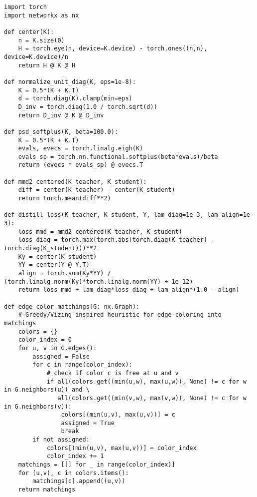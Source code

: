 \documentclass{article}
\begin{document}
\begin{lstlisting}[style=py, caption={Postprocessing, matching-based batching (edge-coloring heuristic), and distillation losses.}]
import torch
import networkx as nx

def center(K):
    n = K.size(0)
    H = torch.eye(n, device=K.device) - torch.ones((n,n), device=K.device)/n
    return H @ K @ H

def normalize_unit_diag(K, eps=1e-8):
    K = 0.5*(K + K.T)
    d = torch.diag(K).clamp(min=eps)
    D_inv = torch.diag(1.0 / torch.sqrt(d))
    return D_inv @ K @ D_inv

def psd_softplus(K, beta=100.0):
    K = 0.5*(K + K.T)
    evals, evecs = torch.linalg.eigh(K)
    evals_sp = torch.nn.functional.softplus(beta*evals)/beta
    return (evecs * evals_sp) @ evecs.T

def mmd2_centered(K_teacher, K_student):
    diff = center(K_teacher) - center(K_student)
    return torch.mean(diff**2)

def distill_loss(K_teacher, K_student, Y, lam_diag=1e-3, lam_align=1e-3):
    loss_mmd = mmd2_centered(K_teacher, K_student)
    loss_diag = torch.max(torch.abs(torch.diag(K_teacher) - torch.diag(K_student)))**2
    Ky = center(K_student)
    YY = center(Y @ Y.T)
    align = torch.sum(Ky*YY) / (torch.linalg.norm(Ky)*torch.linalg.norm(YY) + 1e-12)
    return loss_mmd + lam_diag*loss_diag + lam_align*(1.0 - align)

def edge_color_matchings(G: nx.Graph):
    # Greedy/Vizing-inspired heuristic for edge-coloring into matchings
    colors = {}
    color_index = 0
    for u, v in G.edges():
        assigned = False
        for c in range(color_index):
            # check if color c is free at u and v
            if all(colors.get((min(u,w), max(u,w)), None) != c for w in G.neighbors(u)) and \
               all(colors.get((min(v,w), max(v,w)), None) != c for w in G.neighbors(v)):
                colors[(min(u,v), max(u,v))] = c
                assigned = True
                break
        if not assigned:
            colors[(min(u,v), max(u,v))] = color_index
            color_index += 1
    matchings = [[] for _ in range(color_index)]
    for (u,v), c in colors.items():
        matchings[c].append((u,v))
    return matchings
\end{lstlisting}
\end{document}
